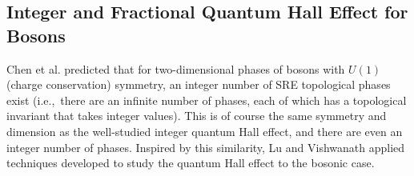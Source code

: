 


\subsection{Integer and Fractional Quantum Hall Effect for Bosons}
\label{subsec::FQHEintro}

Chen et al. predicted that for two-dimensional phases of bosons with $U(1)$ (charge conservation) symmetry, an integer number of SRE topological phases exist (i.e.,~there are an infinite number of phases, each of which has a topological invariant that takes integer values). This is of course the same symmetry and dimension as the well-studied integer quantum Hall effect, and there are even an integer number of phases. Inspired by this similarity, Lu and Vishwanath \cite{LuVishwanath} applied techniques developed to study the quantum Hall effect to the bosonic case.

